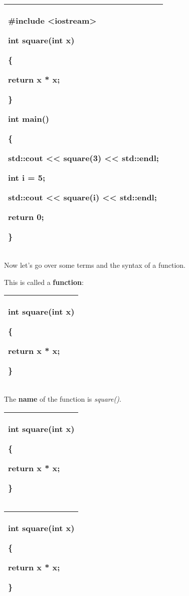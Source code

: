 \documentclass[
]{article}
\begin{document}
\begin{longtable}[]{@{}l@{}}
\toprule
\endhead
\begin{minipage}[t]{0.97\columnwidth}\raggedright
\#include \textless iostream\textgreater{}

int square(int x)

\{

return x * x;

\}

int main()

\{

std::cout \textless\textless{} square(3) \textless\textless{} std::endl;

int i = 5;

std::cout \textless\textless{} square(i) \textless\textless{} std::endl;

return 0;

\}\strut
\end{minipage}\tabularnewline
\bottomrule
\end{longtable}

Now let's go over some terms and the syntax of a function.

This is called a \textbf{function}:

\begin{longtable}[]{@{}l@{}}
\toprule
\endhead
\begin{minipage}[t]{0.97\columnwidth}\raggedright
int square(int x)

\{

return x * x;

\}\strut
\end{minipage}\tabularnewline
\bottomrule
\end{longtable}

The \textbf{name} of the function is \emph{square()}.

\begin{longtable}[]{@{}l@{}}
\toprule
\endhead
\begin{minipage}[t]{0.97\columnwidth}\raggedright
int square(int x)

\{

return x * x;

\}\strut
\end{minipage}\tabularnewline
\bottomrule
\end{longtable}

\begin{longtable}[]{@{}l@{}}
\toprule
\endhead
\begin{minipage}[t]{0.97\columnwidth}\raggedright
int square(int x)

\{

return x * x;

\}\strut
\end{minipage}\tabularnewline
\bottomrule
\end{longtable}
\end{document}
